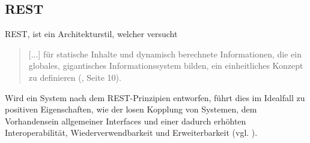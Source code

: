 \subsection{\acs{REST}}\label{section:rest}
\ac{REST}, ist ein Architekturstil, welcher versucht 
\begin{quotation}
[...] für statische Inhalte und dynamisch berechnete Informationen, die ein globales, gigantisches Informationssystem bilden, ein einheitliches Konzept zu definieren (\cite{tilkovrest}, Seite 10).
\end{quotation}
Wird ein System nach dem \ac{REST}-Prinzipien entworfen, führt dies im Idealfall zu positiven Eigenschaften, wie der losen Kopplung von Systemen, dem Vorhandensein allgemeiner Interfaces und einer dadurch erhöhten Interoperabilität, Wiederverwendbarkeit und Erweiterbarkeit (vgl. \cite {tilkovrest}).

